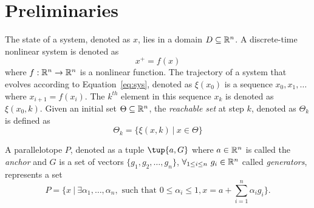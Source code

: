 
\section{Preliminaries}
\label{sec:prelims}

The state of a system, denoted as $x$, lies in a domain $D \subseteq \reals^n$.
%
A discrete-time nonlinear system is denoted as
\begin{equation}
  x^{+} = f(x)
\label{eq:sys}
\end{equation}
%
where $f: \reals^{n} \rightarrow \reals^{n}$ is a nonlinear function.
%
The trajectory of a system that evolves according to Equation~\ref{eq:sys}, denoted as $\xi(x_0)$ is a sequence $x_0, x_1, \ldots $ where $x_{i+1} = f(x_i)$.
%
The $k^{th}$ element in this sequence $x_k$ is denoted as $\xi(x_0,k)$.
%
Given an initial set $\Theta \subseteq \reals^n$, the \emph{reachable set} at step $k$, denoted as $\Theta_k$ is defined as
\begin{equation}
  \Theta_k = \{ \xi(x,k)\: | \: x \in \Theta\}
\label{eq:reachset}
\end{equation}


A parallelotope $P$, denoted as a tuple $\tup{a, G}$ where $a \in \reals^n$ is called the \emph{anchor} and $G$ is a set of vectors $\{g_1, g_2, \ldots, g_n\}$, $\forall_{1 \leq i \leq n} ~ g_i \in \reals^n$ called \emph{generators}, represents a set
\begin{equation}
P = \{ x\:|\: \exists \alpha_1, \ldots, \alpha_n, \mbox{ such that }  0 \leq \alpha_i \leq 1, x = a + \sum_{i=1}^n \alpha_i g_i \}.
\label{eq:ptope}
\end{equation}


